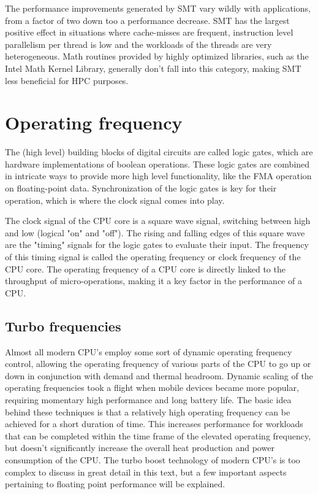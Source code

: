 The performance improvements generated by SMT vary wildly with applications, from a factor of two down too a performance decrease. SMT has the largest positive effect in situations where cache-misses are frequent, instruction level parallelism per thread is low and the workloads of the threads are very heterogeneous. Math routines provided by highly optimized libraries, such as the Intel Math Kernel Library\autocite[]{wiki_mkl}, generally don't fall into this category, making SMT less beneficial for HPC purposes.\vspace{5mm}

\newpage

\section{Operating frequency}

\hspace{4mm}The (high level) building blocks of digital circuits are called logic gates, which are hardware implementations of boolean operations. These logic gates are combined in intricate ways to provide more high level functionality, like the FMA operation on floating-point data. Synchronization of the logic gates is key for their operation, which is where the clock signal comes into play\autocite[]{wiki_clock}.\vspace{5mm}

The clock signal of the CPU core is a square wave signal, switching between high and low (logical "on" and "off"). The rising and falling edges of this square wave are the "timing" signals for the logic gates to evaluate their input. The frequency of this timing signal is called the operating frequency or clock frequency of the CPU core. The operating frequency of a CPU core is directly linked to the throughput of micro-operations\autocite[]{wiki_uop}, making it a key factor in the performance of a CPU.

\subsection*{Turbo frequencies}

\hspace{4mm}Almost all modern CPU's employ some sort of dynamic operating frequency control, allowing the operating frequency of various parts of the CPU to go up or down in conjunction with demand and thermal headroom. Dynamic scaling of the operating frequencies took a flight when mobile devices became more popular, requiring momentary high performance and long battery life. The basic idea behind these techniques is that a relatively high operating frequency can be achieved for a short duration of time. This increases performance for workloads that can be completed within the time frame of the elevated operating frequency, but doesn't significantly increase the overall heat production and power consumption of the CPU. The turbo boost technology of modern CPU's is too complex to discuss in great detail in this text, but a few important aspects pertaining to floating point performance will be explained.\vspace{5mm}

